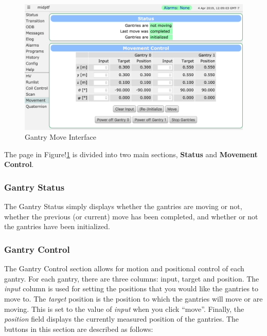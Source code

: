 \documentclass[twoside,letterpaper]{refart}
\begin{document}
\FloatBarrier

\begin{figure}[!htpb]\centering	
	\includegraphics[width=\textwidth]{images/movement.png}
	\caption{Gantry Move Interface\label{gMove}}
\end{figure}

\FloatBarrier

The page in Figure!\ref{gMove} is divided into two main sections, \textbf{Status} and \textbf{Movement Control}.

\subsubsection{Gantry Status}
The Gantry Status simply displays whether the gantries are moving or not, whether the previous (or current) move has been completed, and whether or not the gantries have been initialized.

\subsubsection{Gantry Control}\label{GantryMove}

The Gantry Control section allows for motion and positional control of each gantry. For each gantry, there are three columns: input, target and position. The \emph{input} column is used for setting the positions that you would like the gantries to move to. The \emph{target} position is the position to which the gantries will move or are moving. This is set to the value of \emph{input} when you click ``move''. Finally, the \emph{position} field displays the currently measured position of the gantries. The buttons in this section are described as follows:
\end{document}
